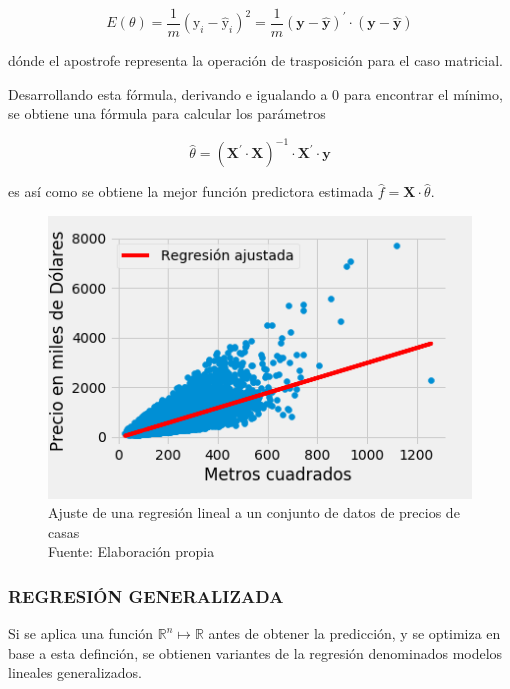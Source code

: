         \begin{equation}
            E(\theta) = \frac{1}{m} (\mathrm{y}_i - \mathrm{\hat{y}}_i)^2 = \frac{1}{m} (\mathbf{y} - \mathbf{\hat{y}})^\prime\cdot (\mathbf{y} - \mathbf{\hat{y}})
        \end{equation}
        
        \noindent dónde el apostrofe representa la operación de trasposición para el caso matricial.
        
        Desarrollando esta fórmula, derivando e igualando a 0 para encontrar el mínimo, se obtiene una fórmula para calcular los parámetros
        
        \begin{equation}
            \hat{\theta} = (\mathbf{X}^\prime\cdot\mathbf{X})^{-1}\cdot\mathbf{X}^\prime\cdot\mathbf{y}
        \end{equation}
        
        \noindent es así como se obtiene la mejor función predictora estimada $\hat{f} = \mathbf{X}\cdot\hat{\theta}$.
        
        \begin{figure}[H]
            \centering
             \includegraphics[scale=0.6]{imagenes/linear_fit}
            \caption[Ajuste de regresión lineal]{Ajuste de una regresión lineal a un conjunto de datos de precios de casas\\ Fuente: Elaboración propia}
        \end{figure}
    	
    	\vspace{-10mm}
    	\subsubsection{REGRESIÓN GENERALIZADA}
    		Si se aplica una función $\mathbb{R}^n\mapsto\mathbb{R}$ antes de obtener la predicción, y se optimiza en base a esta definción, se obtienen variantes de la regresión denominados modelos lineales generalizados.
    		
